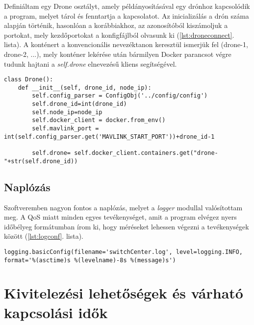 \noindent
Definiáltam egy Drone osztályt, amely példányosításával egy drónhoz kapcsolódik a program, melyet tárol és fenntartja a kapcsolatot. Az inicializálás a drón száma alapján történik, hasonlóan a korábbiakhoz, az azonosítóból kiszámoljuk a portokat, mely kezdőportokat a konfigfájlból olvasunk ki (\ref{lst:droneconnect}. lista). A konténert a konvencionális nevezéktanon keresztül ismerjük fel (drone-1, drone-2, ...), mely konténer lekérése után bármilyen Docker parancsot végre tudunk hajtani a \emph{self.drone} elnevezésű kliens segítségével.

\begin{lstlisting}[caption={Drón konténeréhez csatlakozás}, label={lst:droneconnect}]
class Drone():
	def __init__(self, drone_id, node_ip):
		self.config_parser = ConfigObj('../config/config')
		self.drone_id=int(drone_id)
		self.node_ip=node_ip
		self.docker_client = docker.from_env()
		self.mavlink_port = int(self.config_parser.get('MAVLINK_START_PORT'))+drone_id-1

		self.drone= self.docker_client.containers.get("drone-"+str(self.drone_id))
\end{lstlisting}

\subsection{Naplózás}
Szoftveremben nagyon fontos a naplózás, melyet a \emph{logger} modullal valósítottam meg. A QoS miatt minden egyes tevékenységet, amit a program elvégez nyers időbélyeg formátumban írom ki, hogy méréseket lehessen végezni a tevékenységek között (\ref{lst:logconf}. lista).

\begin{lstlisting}[caption={Naplózás beállítása}, label={lst:logconf}]
logging.basicConfig(filename='switchCenter.log', level=logging.INFO, format='%(asctime)s %(levelname)-8s %(message)s')
\end{lstlisting}

\section{Kivitelezési lehetőségek és várható kapcsolási idők}

